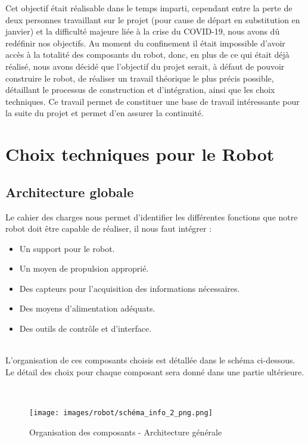 \documentclass[french]{rapportENSTAB}
\begin{document}
Cet objectif était réalisable dans le temps imparti, cependant entre la perte de deux personnes travaillant sur le projet (pour cause de départ en substitution en janvier) et la  difficulté majeure liée à la crise du COVID-19, nous avons dû redéfinir nos objectifs. Au moment du confinement il était impossible d'avoir accès à la totalité des composants du robot, donc, en plus de ce qui était déjà réalisé, nous avons décidé que l'objectif du projet serait, à défaut de pouvoir construire le robot, de réaliser un travail théorique le plus précis possible, détaillant le processus de construction et d'intégration, ainsi que les choix techniques. Ce travail permet de constituer une base de travail intéressante pour la suite du projet et permet d'en assurer la continuité.

\section{Choix techniques pour le Robot}
\subsection{Architecture globale}

Le cahier des charges nous permet d'identifier les différentes fonctions que notre robot doit être capable de réaliser, il nous faut intégrer : 
 \begin{itemize}[label=\textbullet, font=\small\color{blue}]
    \item Un support pour le robot.
    \item Un moyen de propulsion approprié.
    \item Des capteurs pour l'acquisition des informations nécessaires.
    \item Des moyens d'alimentation adéquats.
    \item Des outils de contrôle et d'interface.
\end{itemize}   \\ 

L'organisation de ces composants choisis  est détallée dans le schéma ci-dessous. Le détail des choix pour chaque composant sera donné dans une partie ultérieure.

 \\
 
 \begin{figure}[H]
    \centering
    \texttt{[image: images/robot/schéma\_info\_2\_png.png]}
    \caption{Organisation des composants - Architecture générale}
    \label{fig:cdcf}
\end{figure}
\end{document}
